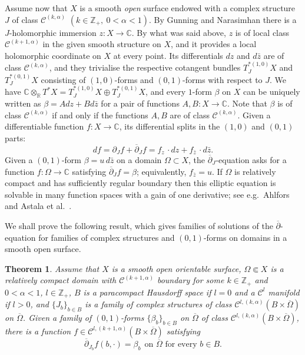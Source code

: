 \documentclass[11pt]{amsart}
\numberwithin{equation}{section}
\newtheorem{theorem}{Theorem}[section]
\theoremstyle{definition}
\newcommand\Cscr{\mathscr{C}}
\newcommand\C{\mathbb{C}}
\newcommand\R{\mathbb{R}}
\newcommand\Z{\mathbb{Z}}
\newcommand\di{\partial}
\newcommand\dibar{\overline\partial}
\begin{document}
Assume now that $X$ is a smooth {\em open} surface endowed
with a complex structure $J$ of class $\Cscr^{(k,\alpha)}$
$(k\in \Z_+,\ 0<\alpha<1)$.
By Gunning and Narasimhan \cite{GunningNarasimhan1967} 
there is a $J$-holomorphic immersion $z:X\to \C$.
By what was said above, $z$ is of local class 
$\Cscr^{(k+1,\alpha)}$ in the given smooth structure on $X$, and 
it provides a local holomorphic coordinate on $X$ at every point. 
Its differentials $dz$ and $d\bar z$ are of class $\Cscr^{(k,\alpha)}$, 
and they trivialise the respective cotangent bundles 
$T^{*(1,0)}_J X$ and $T^{*(0,1)}_J X$ 
consisting of $(1,0)$-forms and $(0,1)$-forms with respect to $J$. 
We have $\C\otimes_\R T^*X= T^{*(1,0)}_J X\oplus T^{*(0,1)}_J X$,
and every $1$-form $\beta$ on $X$ can be uniquely written
as $\beta = A dz + B d\bar z$ for a pair of functions $A,B:X\to \C$.
Note that $\beta$ is of class $\Cscr^{(k,\alpha)}$ if and only if 
the functions $A,B$ are of class $\Cscr^{(k,\alpha)}$. 
Given a differentiable function $f:X\to \C$, its differential splits
in the $(1,0)$ and $(0,1)$ parts: 
\begin{equation}\label{eq:derivatives}
	df=\di_J f+\dibar_J f=f_z \,\cdotp dz + f_{\bar z} \,\cdotp d\bar z.  
\end{equation}
Given a $(0,1)$-form $\beta=u \, d\bar z$ on a domain $\Omega\subset X$,
the $\dibar_J$-equation asks for a function $f:\Omega\to \C$ 
satisfying $\dibar_J f=\beta$; equivalently, $f_{\bar z}=u$.
If $\Omega$ is relatively compact and has sufficiently regular boundary
then this elliptic equation is solvable in many function
spaces with a gain of one derivative; see e.g.\  
Ahlfors \cite{Ahlfors2006} and Astala et al.\ \cite{AstalaIwaniecMartin2009}.

We shall prove the following result, which gives families 
of solutions of the $\dibar$-equation 
for families of complex structures and $(0,1)$-forms
on domains in a smooth open surface. 

%
%
\begin{theorem}\label{th:dibar}
Assume that $X$ is a smooth open orientable surface, 
$\Omega\Subset X$ is a relatively compact domain with 
$\Cscr^{(k+1,\alpha)}$ boundary for some $k\in\Z_+$ and
$0<\alpha<1$, $l\in \Z_+$, $B$ is a paracompact Hausdorff
space if $l=0$ and a $\Cscr^l$ manifold if $l>0$,
and $\{J_b\}_{b\in B}$ is a family of complex structures 
of class $\Cscr^{l,(k,\alpha)}(B\times \overline\Omega)$ 
on $\overline\Omega$.
Given a family of $(0,1)$-forms $\{\beta_b\}_{b\in B}$ 
on $\overline\Omega$ of class 
$\Cscr^{l,(k,\alpha)}(B\times \overline\Omega)$, 
there is a function 
$f\in \Cscr^{l,(k+1,\alpha)}(B\times\overline\Omega)$ satisfying
\begin{equation}\label{eq:dibar}
	\dibar_{J_b} f(b,\cdotp) = \beta_b \ \ 
	\text{on $\overline \Omega$ for every $b\in B$.}
\end{equation}
\end{theorem}
\end{document}
